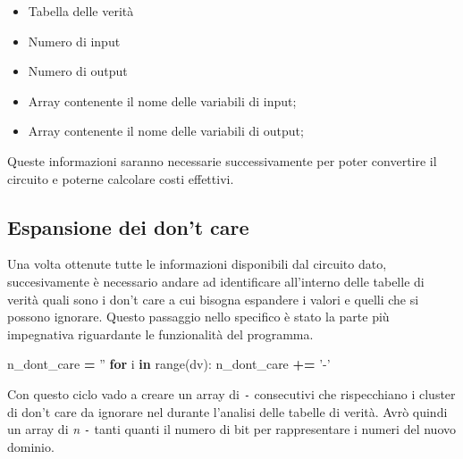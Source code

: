 \documentclass[]{book}
\newenvironment{Shaded}{\begin{snugshade}}{\end{snugshade}}
\newcommand{\BuiltInTok}[1]{#1}
\newcommand{\ControlFlowTok}[1]{\textcolor[rgb]{0.13,0.29,0.53}{\textbf{#1}}}
\newcommand{\KeywordTok}[1]{\textcolor[rgb]{0.13,0.29,0.53}{\textbf{#1}}}
\newcommand{\NormalTok}[1]{#1}
\newcommand{\OperatorTok}[1]{\textcolor[rgb]{0.81,0.36,0.00}{\textbf{#1}}}
\newcommand{\StringTok}[1]{\textcolor[rgb]{0.31,0.60,0.02}{#1}}
\providecommand{\tightlist}{%
  \setlength{\itemsep}{0pt}\setlength{\parskip}{0pt}}
\begin{document}
\begin{itemize}
\tightlist
\item
  Tabella delle verità
\item
  Numero di input
\item
  Numero di output
\item
  Array contenente il nome delle variabili di input;
\item
  Array contenente il nome delle variabili di output;
\end{itemize}

Queste informazioni saranno necessarie successivamente per poter convertire il circuito e poterne calcolare costi effettivi.

\newpage

\hypertarget{espansione-dei-dont-care}{%
\subsection{Espansione dei don't care}\label{espansione-dei-dont-care}}

Una volta ottenute tutte le informazioni disponibili dal circuito dato, succesivamente è necessario andare ad identificare all'interno delle tabelle di verità quali sono i don't care a cui bisogna espandere i valori e quelli che si possono ignorare. Questo passaggio nello specifico è stato la parte più impegnativa riguardante le funzionalità del programma.

\begin{Shaded}
\begin{Highlighting}[]
\NormalTok{n_dont_care }\OperatorTok{=} \StringTok{''}
  \ControlFlowTok{for}\NormalTok{ i }\KeywordTok{in} \BuiltInTok{range}\NormalTok{(dv):}
\NormalTok{    n_dont_care }\OperatorTok{+=} \StringTok{'-'}
\end{Highlighting}
\end{Shaded}

Con questo ciclo vado a creare un array di \texttt{-} consecutivi che rispecchiano i cluster di don't care da ignorare nel durante l'analisi delle tabelle di verità. Avrò quindi un array di \emph{n} \texttt{-} tanti quanti il numero di bit per rappresentare i numeri del nuovo dominio.
\end{document}
